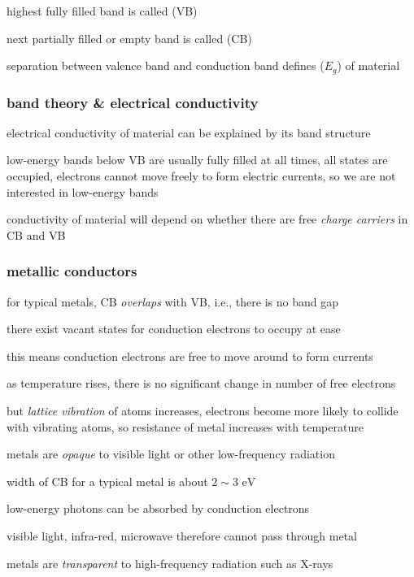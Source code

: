 highest fully filled band is called  (VB)

next partially filled or empty band is called  (CB)

separation between valence band and conduction band defines  ($E_g$) of material 


\subsubsection{band theory \& electrical conductivity}\label{band-theory}

electrical conductivity of material can be explained by its band structure

low-energy bands below VB are usually fully filled at all times, all states are occupied, electrons cannot move freely to form electric currents, so we are not interested in low-energy bands

conductivity of material will depend on whether there are free \emph{charge carriers} in CB and VB


\subsubsection*{metallic conductors}

for typical metals, CB \emph{overlaps} with VB, i.e., there is no band gap

there exist vacant states for conduction electrons to occupy at ease

this means conduction electrons are free to move around to form currents

as temperature rises, there is no significant change in number of free electrons

but \emph{lattice vibration} of atoms increases, electrons become more likely to collide with vibrating atoms, so resistance of metal increases with temperature

\cmt metals are \emph{opaque} to visible light or other low-frequency radiation

width of CB for a typical metal is about $2\sim3 \text{ eV}$

low-energy photons can be absorbed by conduction electrons

visible light, infra-red, microwave therefore cannot pass through metal

\cmt metals are \emph{transparent} to high-frequency radiation such as X-rays

